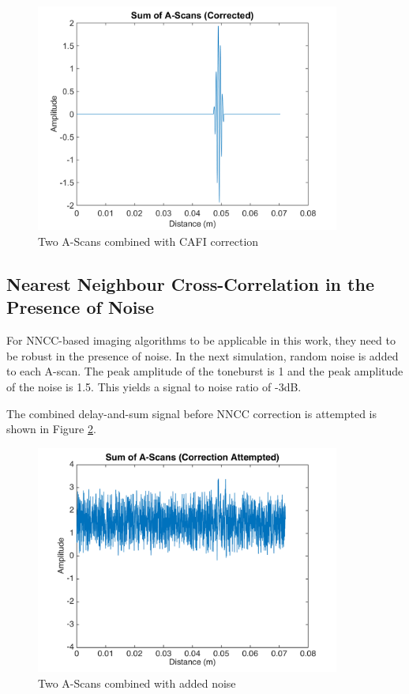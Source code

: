\begin{figure}[htb]
\centering
		\includegraphics[width=100mm]{Anisotropic_8.png}
		\caption{Two A-Scans combined with CAFI correction}
		\label{fig:cafi_anisotropic8}
\end{figure}
\clearpage
\subsection{Nearest Neighbour Cross-Correlation in the Presence of Noise}

For NNCC-based imaging algorithms to be applicable in this work, they need to be robust in the presence of noise. In the next simulation, random noise is added to each A-scan. The peak amplitude of the toneburst is 1 and the peak amplitude of the noise is 1.5. This yields a signal to noise ratio of -3dB.

The combined delay-and-sum signal before NNCC correction is attempted is shown in Figure \ref{fig:cafi_noise4}.

\begin{figure}[htb]
\centering
		\includegraphics[width=100mm]{Noise_4.png}
		\caption{Two A-Scans combined with added noise}
		\label{fig:cafi_noise4}
\end{figure}

